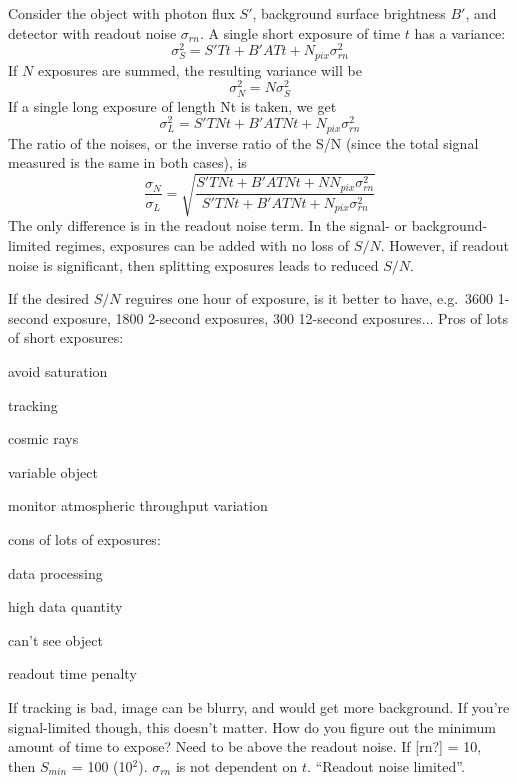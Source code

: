 \documentclass[12pt]{article}
\begin{document}
Consider the object with photon flux $S'$,
background surface brightness $B'$, and detector
with readout noise $\sigma_{rn}$. A single short exposure of
time $t$ has a variance:
    $$ \sigma_S^2 = S'Tt + B'ATt + N_{pix}\sigma_{rn}^2 $$
If $N$ exposures are summed, the resulting variance will be
    $$ \sigma_N^2 = N\sigma_S^2 $$
If a single long exposure of length Nt is taken, we get
    $$ \sigma_L^2 = S'TNt + B'ATNt + N_{pix}\sigma_{rn}^2 $$
The ratio of the noises, or the inverse ratio of the S/N (since the
total signal measured is the same in both cases), is
    $$ \frac{\sigma_N}{\sigma_L} = \sqrt{\frac
    {S'TNt + B'ATNt + NN_{pix}\sigma_{rn}^2 }
    {S'TNt + B'ATNt + N_{pix}\sigma_{rn}^2}
    }$$
The only difference is in the readout noise term.
In the signal- or background-limited regimes, exposures can be added
with no loss of $S/N$. However, if readout noise is significant, then
splitting exposures leads to reduced $S/N$.

\textcolor{myBlue}{If the desired $S/N$ reguires one hour of exposure,
    is it better to have, e.g.\ 3600 1-second exposure, 1800 2-second
    exposures, 300 12-second exposures$\ldots$
    Pros of lots of short exposures:
    \begin{itemize*}
        \item avoid saturation
        \item tracking
        \item cosmic rays
        \item variable object
        \item monitor atmospheric throughput variation
    \end{itemize*}
    cons of lots of exposures:
    \begin{itemize*}
        \item data processing
        \item high data quantity
        \item can't see object
        \item readout time penalty
    \end{itemize*}
    If tracking is bad, image can be blurry, and would get more background.
    If you're signal-limited though, this doesn't matter.
    How do you figure out the minimum amount of time to expose?
    Need to be above the readout noise. If [rn?] = 10, then
    $S_{min}$ = 100 (10$^2$). $\sigma_{rn}$ is not dependent on $t$.
    ``Readout noise limited''.
}

\textcolor{om}{\emph{}}
\end{document}
